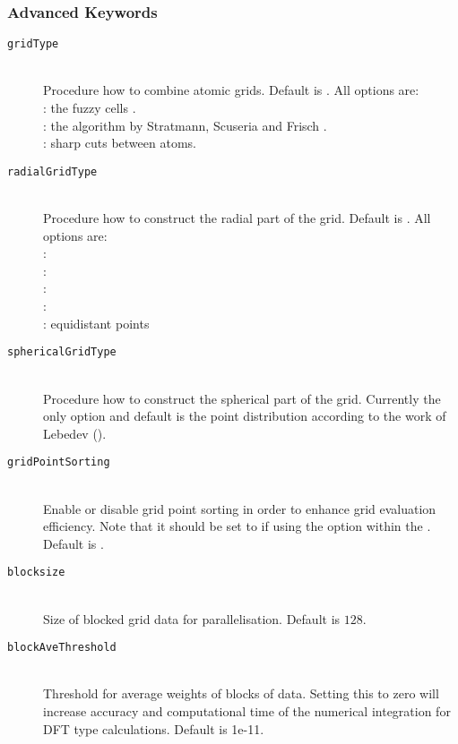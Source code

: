 \subsubsection{Advanced Keywords}
\begin{description}
    \item [\texttt{gridType}]\hfill \\
    Procedure how to combine atomic grids. Default is .
    All options are:\\
    : the fuzzy cells \cite{beck1988}.\\ 
    : the algorithm by Stratmann, Scuseria and Frisch \cite{stra1996}.\\ 
    : sharp cuts between atoms.
    \item [\texttt{radialGridType}]\hfill \\
    Procedure how to construct the radial part of the grid. Default is .
    All options are:\\
    : \cite{beck1988, Gill2003} \\
    : \cite{Murray1993, Gill2003} \\
    : \cite{Treutler1995, krack1998adaptive} \\
    : \cite{Mura1996, Gill2003} \\
    : equidistant points
    \item [\texttt{sphericalGridType}]\hfill \\
    Procedure how to construct the spherical part of the grid. Currently the only option and default is 
    the point distribution according to the work of Lebedev ().
    \item [\texttt{gridPointSorting}]\hfill \\
    Enable or disable grid point sorting in order to enhance grid evaluation efficiency. Note that it should be
    set to  if using the  option within the . Default is .
    \item [\texttt{blocksize}]\hfill \\
    Size of blocked grid data  for parallelisation. Default is $128$.
    \item [\texttt{blockAveThreshold}]\hfill \\
    Threshold for average weights of blocks of data. Setting this to zero will increase accuracy and computational time of the numerical 
    integration for DFT type calculations. Default is 1e-11.

\end{description}
